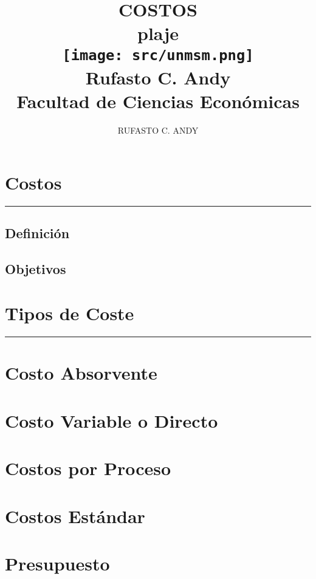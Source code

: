 \documentclass[15pt]{report}
\title{
        {\sc \bf \color{usm} \huge{COSTOS}\\ \LARGE{plaje}}
        \\
      {\texttt{[image: src/unmsm.png]}}
       \\
        {Rufasto C. Andy}
       \\
        {Facultad de Ciencias Económicas}
       }
\author{RUFASTO C. ANDY}
\date{}
\begin{document}
	\begingroup
	\Large
	\maketitle 
\newpage
	\tableofcontents
\newpage
	\chapter{\color{usm}Costos}
	\maketitle \vskip-25pt \hrule\vskip10pt
\section{Definición}
	
\section{Objetivos}
	
\newpage
	\chapter{\color{usm}Tipos de Coste}
	\maketitle \vskip-25pt \hrule\vskip10pt
	
	\endgroup
	\chapter{\color{usm}Costo Absorvente}
	
	\chapter{\color{usm}Costo Variable o Directo}
	

\newpage
	\chapter{\color{usm}Costos por Proceso}
	
	\flushleft
	\chapter{\color{usm}Costos Estándar}
	
	\chapter{\color{usm}Presupuesto}
	
\end{document}
